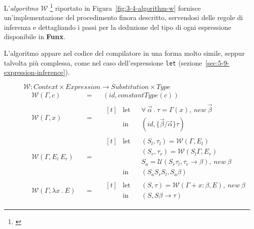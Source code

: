 \noindent L'\textit{algoritmo $\mathcal{W}$}%
\footnote{ \cite{Lee-1998-FolkloreInference}}
riportato in Figura~\ref{fig:3-4-algorithm-w} fornisce un'implementazione del procedimento finora descritto,
servendosi delle regole di inferenza e dettagliando i passi per la deduzione del tipo di ogni espressione disponibile in \textbf{Funx}.

\noindent L'algoritmo appare nel codice del compilatore in una forma molto simile, seppur talvolta più complessa,
come nel caso dell'espressione \texttt{let} (sezione~\ref{sec:5-9-expression-inference}).

\newpage

\begin{figure}
    $\mathcal{W} : Context \times Expression \rightarrow Substitution \times Type$
    \newcommand{\algW}[2]{\mathcal{W}(#1, #2)}
    \newcommand{\algWline}[2]{& \algW{#1}{#2} & & = & &}
    \[
        \begin{aligned}
            \algWline{\Gamma}{c} (id, constantType(c))
            \\
            \algWline{\Gamma}{x}
            \begin{aligned}[t]
                 & \text{let} &  & \forall\ \vec{\alpha}\ .\ \tau = \Gamma(x),\ new\ \vec{\beta} \\
                 & \text{in}  &  & (id, \{\vec{\beta} / \vec{\alpha}\} \tau)
            \end{aligned}
            \\
            \algWline{\Gamma}{E_l\ E_r}
            \begin{aligned}[t]
                 & \text{let} &  & (S_l, \tau_l) = \algW{\Gamma}{E_l}                                   \\
                 &            &  & (S_r, \tau_r) = \algW{S_l\Gamma}{E_r}                                \\
                 &            &  & S_a = \mathcal{U}(S_r \tau_l, \tau_r \rightarrow \beta),\ new\ \beta \\
                 & \text{in}  &  & (S_a S_r S_l, S_a \beta)
            \end{aligned}
            \\
            \algWline{\Gamma}{\lambda x\ .\ E}
            \begin{aligned}[t]
                 & \text{let} &  & (S, \tau) = \algW{\Gamma + x : \beta}{E},\ new\ \beta \\
                 & \text{in}  &  & (S, S \beta \rightarrow \tau)

\end{aligned}
\end{aligned}\]
\end{figure}

